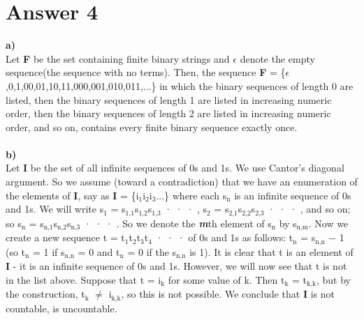 \documentclass[11pt]{article}
\begin{document}
\section*{Answer 4}
\textbf{a)}\\
Let \textbf{F} be the set containing finite binary strings and $\epsilon$ denote the empty sequence(the sequence with no terms). Then, the sequence \textbf{F} = \{$\epsilon$,0,1,00,01,10,11,000,001,010,011,...\} in which the binary sequences of length 0 are listed, then the binary sequences of length 1 are listed in increasing numeric order, then the binary sequences of length 2 are listed in increasing numeric order, and so on, contains every finite binary sequence exactly once.\\
\\
\textbf{b)}\\
Let \textbf{I} be the set of all infinite sequences of 0s and 1s. We use Cantor’s diagonal argument. So we assume (toward
a contradiction) that we have an enumeration of the elements of \textbf{I}, say as \textbf{I} = \{i$_\text{1}$i$_\text{2}$i$_\text{3}$...\} where each s$_\text{n}$ is an infinite sequence of 0s and 1s. We will write s$_\text{1}$ = s$_\text{1,1}$s$_\text{1,2}$s$_\text{1,3}$ · · · , s$_\text{2}$ = s$_\text{2,1}$s$_\text{2,2}$s$_\text{2,3}$ · · · , and so on; so s$_\text{n}$ = s$_\text{n,1}$s$_\text{n,2}$s$_\text{n,3}$ · · · . So we denote the \textbf{\textit{m}}th element of s$_\text{n}$ by s$_\text{n,m}$. Now we create a new sequence t = t$_\text{1}$t$_\text{2}$t$_\text{3}$t$_\text{4}$ · · · of 0s and 1s as follows: t$_\text{n}$ = s$_\text{n,n}$ − 1 (so t$_\text{n}$ = 1 if s$_\text{n,n}$ = 0 and t$_\text{n}$ = 0 if the s$_\text{n,n}$ is 1).  It is clear that t is an element of \textbf{I} - it is an infinite sequence of 0s and 1s. However, we will now see that t is not in the list above. Suppose that t = i$_\text{k}$ for some value of k. Then t$_\text{k}$ = t$_\text{k,k}$, but by the construction, t$_\text{k}$ $\neq$ i$_\text{k,k}$, so this is not possible. We
conclude that \textbf{I} is not countable, is uncountable.\\
\end{document}

